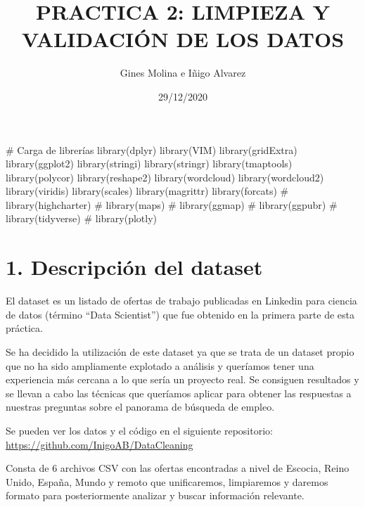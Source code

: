 \documentclass[
]{article}
\title{PRACTICA 2: LIMPIEZA Y VALIDACIÓN DE LOS DATOS}
\author{Gines Molina e Iñigo Alvarez}
\date{29/12/2020}
\newenvironment{Shaded}{\begin{snugshade}}{\end{snugshade}}
\newcommand{\CommentTok}[1]{\textcolor[rgb]{0.50,0.62,0.50}{#1}}
\newcommand{\KeywordTok}[1]{\textcolor[rgb]{0.94,0.87,0.69}{#1}}
\newcommand{\NormalTok}[1]{\textcolor[rgb]{0.80,0.80,0.80}{#1}}
\begin{document}
\maketitle

{
\setcounter{tocdepth}{2}
\tableofcontents
}
\begin{Shaded}
\begin{Highlighting}[]
\CommentTok{\# Carga de librerías}
\KeywordTok{library}\NormalTok{(dplyr)}
\KeywordTok{library}\NormalTok{(VIM)}
\KeywordTok{library}\NormalTok{(gridExtra)}
\KeywordTok{library}\NormalTok{(ggplot2)}
\KeywordTok{library}\NormalTok{(stringi)}
\KeywordTok{library}\NormalTok{(stringr)}
\KeywordTok{library}\NormalTok{(tmaptools)}
\KeywordTok{library}\NormalTok{(polycor)}
\KeywordTok{library}\NormalTok{(reshape2)}
\KeywordTok{library}\NormalTok{(wordcloud)}
\KeywordTok{library}\NormalTok{(wordcloud2)}
\KeywordTok{library}\NormalTok{(viridis)}
\KeywordTok{library}\NormalTok{(scales)}
\KeywordTok{library}\NormalTok{(magrittr)}
\KeywordTok{library}\NormalTok{(forcats)}
\CommentTok{\# library(highcharter)}
\CommentTok{\# library(maps)}
\CommentTok{\# library(ggmap)}
\CommentTok{\# library(ggpubr)}
\CommentTok{\# library(tidyverse)}
\CommentTok{\# library(plotly)}
\end{Highlighting}
\end{Shaded}

\hypertarget{descripcion-del-dataset}{%
\section{1. Descripción del dataset}\label{descripcion-del-dataset}}

El dataset es un listado de ofertas de trabajo publicadas en Linkedin
para ciencia de datos (término ``Data Scientist'') que fue obtenido en
la primera parte de esta práctica.

Se ha decidido la utilización de este dataset ya que se trata de un
dataset propio que no ha sido ampliamente explotado a análisis y
queríamos tener una experiencia más cercana a lo que sería un proyecto
real. Se consiguen resultados y se llevan a cabo las técnicas que
queríamos aplicar para obtener las respuestas a nuestras preguntas sobre
el panorama de búsqueda de empleo.

Se pueden ver los datos y el código en el siguiente repositorio:
\url{https://github.com/InigoAB/DataCleaning}

Consta de 6 archivos CSV con las ofertas encontradas a nivel de Escocia,
Reino Unido, España, Mundo y remoto que unificaremos, limpiaremos y
daremos formato para posteriormente analizar y buscar información
relevante.
\end{document}
